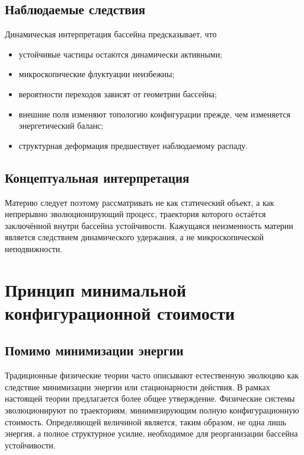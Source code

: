 \section{Наблюдаемые следствия}

Динамическая интерпретация бассейна предсказывает, что

\begin{itemize}

\item устойчивые частицы остаются динамически активными;

\item микроскопические флуктуации неизбежны;

\item вероятности переходов зависят
от геометрии бассейна;

\item внешние поля изменяют
топологию конфигурации
прежде, чем изменяется энергетический баланс;

\item структурная деформация
предшествует наблюдаемому распаду.

\end{itemize}

\section{Концептуальная интерпретация}

Материю следует поэтому рассматривать не как статический объект, а как непрерывно эволюционирующий процесс, траектория которого остаётся заключённой внутри бассейна устойчивости. Кажущаяся неизменность материи является следствием динамического удержания, а не микроскопической неподвижности.

\chapter{Принцип минимальной конфигурационной стоимости}

\section{Помимо минимизации энергии}

Традиционные физические теории часто описывают естественную эволюцию как следствие минимизации энергии или стационарности действия. В рамках настоящей теории предлагается более общее утверждение. Физические системы эволюционируют по траекториям, минимизирующим полную конфигурационную стоимость. Определяющей величиной является, таким образом, не одна лишь энергия, а полное структурное усилие, необходимое для реорганизации бассейна устойчивости.

